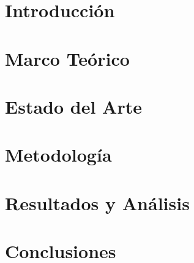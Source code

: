 \documentclass[
	spanish, %
	letterpaper, oneside
]{book}
\begin{document}
\templateFinalcfg


\chapter{Introducción}



\newpage
\chapter{Marco Teórico}



\chapter{Estado del Arte}



\newpage
\chapter{Metodología}



\newpage 
\chapter{Resultados y Análisis}



\newpage
\chapter{Conclusiones}





\newpage





\end{document}
